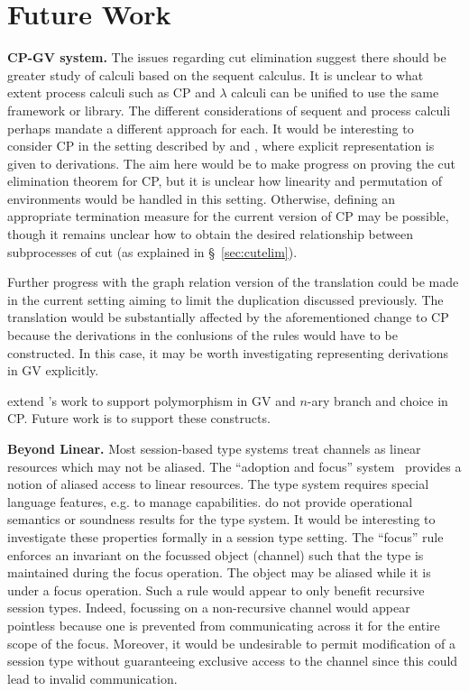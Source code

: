 \section{Future Work}

\textbf{CP-GV system.} The issues regarding cut elimination suggest there
should be greater study of calculi based on the sequent calculus. It is
unclear to what extent process calculi such as CP and $\lambda$ calculi can be
unified to use the same framework or library. The different considerations of
sequent and process calculi perhaps mandate a different approach for each. It
would be interesting to consider CP in the setting described by
\citeauthor{Tews:2013} and \citeauthor{Dawson:2010}, where explicit
representation is given to derivations. The aim here would be to make progress
on proving the cut elimination theorem for CP, but it is unclear how linearity
and permutation of environments would be handled in this setting. Otherwise,
defining an appropriate termination measure for the current version of CP may
be possible, though it remains unclear how to obtain the desired relationship
between subprocesses of cut (as explained in \S~\ref{sec:cutelim}).

Further progress with the graph relation version of the translation could be
made in the current setting aiming to limit the duplication discussed
previously. The translation would be substantially affected by the
aforementioned change to CP because the derivations in the conlusions of the
rules would have to be constructed. In this case, it may be worth
investigating representing derivations in GV explicitly.

\citeauthor{Lindley:2014:SAP} extend \citeauthor{Wadler:2014}'s work to
support polymorphism in GV and $n$-ary branch and choice in CP. Future work is
to support these constructs.

\textbf{Beyond Linear.} Most session-based type systems treat channels as
linear resources which may not be aliased. The ``adoption and focus''
system~\cite{Fahndrich:2002} provides a notion of aliased access to linear
resources. The type system requires special
language features, e.g. to manage capabilities. \citeauthor{Fahndrich:2002} do
not provide operational semantics or soundness results for the type system. It
would be interesting to investigate these properties formally in a session
type setting. The ``focus'' rule enforces an invariant on the focussed object
(channel) such that the type is maintained during the focus operation. The
object may be aliased while it is under a focus operation. Such a rule would
appear to only benefit recursive session types. Indeed, focussing on a
non-recursive channel would appear pointless because one is prevented from
communicating across it for the entire scope of the focus. Moreover, it would
be undesirable to permit modification of a session type without guaranteeing
exclusive access to the channel since this could lead to invalid
communication.

